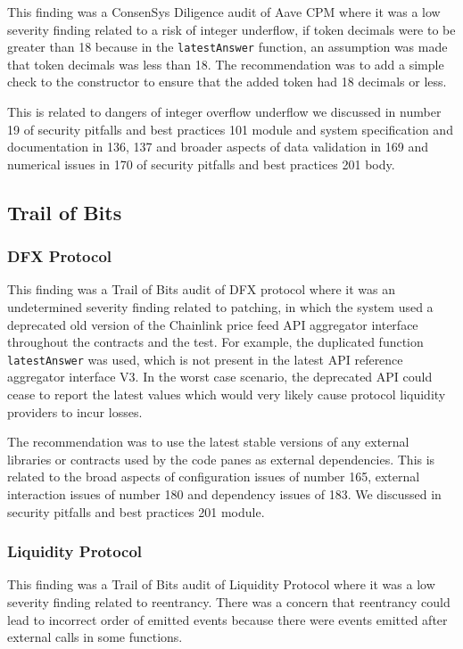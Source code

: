 This finding was a ConsenSys Diligence audit of Aave CPM where it was a
low severity finding related to a risk of integer underflow, if token
decimals were to be greater than 18 because in the \texttt{latestAnswer}
function, an assumption was made that token decimals was less than 18.
The recommendation was to add a simple check to the constructor to
ensure that the added token had 18 decimals or less.

This is related to dangers of integer overflow underflow we discussed in
number 19 of security pitfalls and best practices 101 module and system
specification and documentation in 136, 137 and broader aspects of data
validation in 169 and numerical issues in 170 of security pitfalls and
best practices 201 body.

\subsection{Trail of Bits}\label{trail-of-bits}

\subsubsection{DFX Protocol}\label{dfx-protocol}

This finding was a Trail of Bits audit of DFX protocol where it was an
undetermined severity finding related to patching, in which the system
used a deprecated old version of the Chainlink price feed API aggregator
interface throughout the contracts and the test. For example, the
duplicated function \texttt{latestAnswer} was used, which is not present
in the latest API reference aggregator interface V3. In the worst case
scenario, the deprecated API could cease to report the latest values
which would very likely cause protocol liquidity providers to incur
losses.

The recommendation was to use the latest stable versions of any external
libraries or contracts used by the code panes as external dependencies.
This is related to the broad aspects of configuration issues of number
165, external interaction issues of number 180 and dependency issues of
183. We discussed in security pitfalls and best practices 201 module.

\subsubsection{Liquidity Protocol}\label{liquidity-protocol}

This finding was a Trail of Bits audit of Liquidity Protocol where it
was a low severity finding related to reentrancy. There was a concern
that reentrancy could lead to incorrect order of emitted events because
there were events emitted after external calls in some functions.

